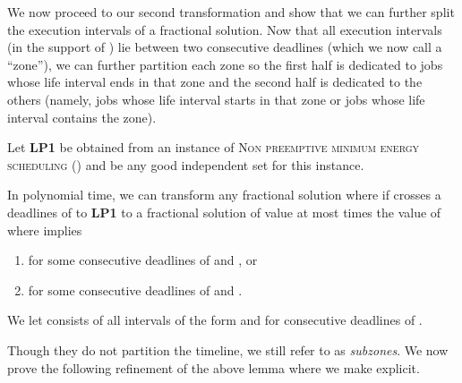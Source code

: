 We now proceed to our second transformation and show that we can further split the execution intervals of a fractional solution. Now that all execution intervals
(in the support of ) lie between two consecutive deadlines (which we now call a ``zone''), we can further partition each zone so the first half
is dedicated to jobs whose life interval ends in that zone and the second half is dedicated to the others (namely, jobs whose life interval starts
in that zone or jobs whose life interval contains the zone).


\begin{lem}\label{lemma:subzones}
  Let \textbf{LP1} be obtained from an instance of \textsc{Non preemptive minimum energy scheduling ()} and  be any good independent set for this instance.

  In polynomial time, we can transform any fractional solution  where  if  crosses a deadlines of  to \textbf{LP1} to a fractional solution  of value at most  times the value of   where  implies
  \begin{enumerate}
  \item
     for some consecutive deadlines   of  and , or
  \item
     for some consecutive deadlines   of  and .
  \end{enumerate}
\end{lem}

We let  consists of all intervals of the form  and  
for consecutive deadlines  of .

Though they do not partition the timeline, we still refer to  as \emph{subzones}. We now prove the following refinement of the above lemma where we make  explicit.

